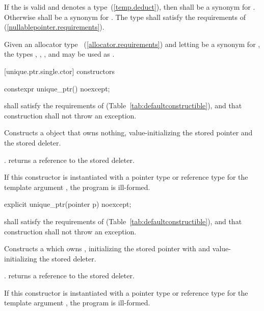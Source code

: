 \pnum
If the   is valid and denotes a
type~(\ref{temp.deduct}), then  shall be a synonym for . Otherwise
 shall be a synonym for . The type  shall
satisfy the requirements of  (\ref{nullablepointer.requirements}).

\pnum
\begin{example} Given an allocator type ~(\ref{allocator.requirements}) and
letting  be a synonym for , the types ,
, , and 
may be used as . \end{example}

[unique.ptr.single.ctor]{ constructors}

%
\begin{itemdecl}
constexpr unique_ptr() noexcept;
\end{itemdecl}

\begin{itemdescr}
\pnum
\requires {} shall
satisfy the requirements of  (Table~\ref{tab:defaultconstructible}),
and that construction shall not throw an exception.

\pnum
\effects Constructs a  object that owns
nothing, value-initializing the stored pointer and the stored deleter.

\pnum
\postconditions {}. 
returns a reference to the stored deleter.

\pnum
\remarks If this constructor is instantiated with a pointer type or reference type
for the template argument , the program is ill-formed.
\end{itemdescr}

%
\begin{itemdecl}
explicit unique_ptr(pointer p) noexcept;
\end{itemdecl}

\begin{itemdescr}
\pnum
\requires {} shall
satisfy the requirements of  (Table~\ref{tab:defaultconstructible}),
and that construction shall not throw an exception.

\pnum
\effects Constructs a  which owns
, initializing the stored pointer with  and
value-initializing the stored deleter.

\pnum
\postconditions {}. 
returns a reference to the stored deleter.

\pnum
\remarks If this constructor is instantiated with a pointer type or reference type
for the template argument , the program is ill-formed.
\end{itemdescr}

